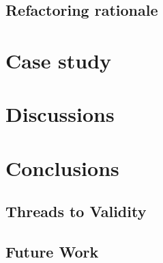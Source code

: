 \documentclass[english,12pt,a4paper,pdftex,sci,utf8]{aaltothesis}
\begin{document}
\subsection{Refactoring rationale}


\section{Case study} \label{case study}


\section{Discussions} \label{discussions}
\section{Conclusions} \label{conclusions}
\subsection{Threads to Validity} \label{validity}
\subsection{Future Work} \label{future}

\clearpage

{}
\begin{thebibliography}{99}



  


\end{thebibliography}
\end{document}
